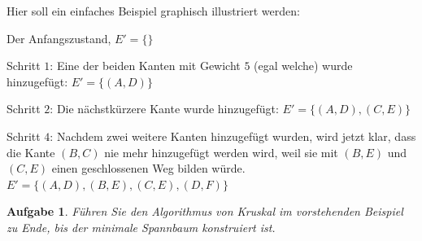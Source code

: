 \documentclass[12pt,a4paper]{report}
\theoremstyle{break}
\newtheorem{exercise}{Aufgabe}[section]
\theoremstyle{plain}
\newcommand{\algostep}[2]{\parbox{4cm}{\scalebox{0.5}{\texttt{[image: \#1]}}}
  \hfill
  \parbox{7cm}{#2}
}
\begin{document}
\newpage
Hier soll ein einfaches Beispiel graphisch illustriert werden:

\algostep{Demo.pdf}{Der Anfangszustand, $E' = \{\}$}
\algostep{DemoKruskal1.pdf}{Schritt $1$: Eine der beiden Kanten mit Gewicht $5$
  (egal welche) wurde hinzugef\"ugt: $E' = \{(A,D)\}$}
\algostep{DemoKruskal2.pdf}{Schritt $2$: Die n\"{a}chstk\"{u}rzere
  Kante wurde hinzugef\"ugt: $E' = \{(A,D), (C,E)\}$}
\algostep{DemoKruskal3.pdf}{Schritt $4$: Nachdem zwei weitere Kanten
  hinzugef\"ugt wurden, wird jetzt klar, dass die Kante $(B,C)$ nie
  mehr hinzugef\"ugt werden wird, weil sie mit $(B,E)$ und $(C,E)$
  einen geschlossenen Weg bilden w\"{u}rde. $E' = \{(A,D), (B,E),
  (C,E), (D,F)\}$}

\newpage
\begin{exercise}\label{exkruskal}
F\"{u}hren Sie den Algorithmus von Kruskal im vorstehenden Beispiel zu
Ende, bis der minimale Spannbaum konstruiert ist.
\end{exercise}
\end{document}
